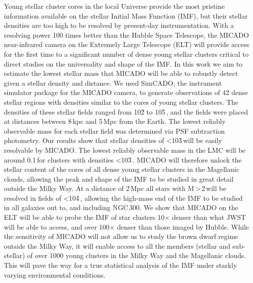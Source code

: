 % 

\abstract
{Young stellar cluster cores in the local Universe provide the most pristine information available on the stellar Initial Mass Function (IMF), but their stellar densities are too high to be resolved by present-day instrumentation. With a resolving power 100 times better than the Hubble Space Telescope, the MICADO near-infrared camera on the Extremely Large Telescope (ELT) will provide access for the first time to a significant number of dense young stellar clusters critical to direct studies on the universality and shape of the IMF.}
{In this work we aim to estimate the lowest stellar mass that MICADO will be able to robustly detect given a stellar density and distance.}
{We used SimCADO, the instrument simulator package for the MICADO camera, to generate observations of 42 dense stellar regions with densities similar to the cores of young stellar clusters. The densities of these stellar fields ranged from 10\h2 to 10\h5\,\spa, and the fields were placed at distances between 8\,kpc and 5\,Mpc from the Earth. The lowest reliably observable mass for each stellar field was determined via PSF subtraction photometry.}
{Our results show that stellar densities of \textless10\h3\,\spa will be easily resolvable by MICADO. The lowest reliably observable mass in the LMC will be around 0.1\,\msun for clusters with densities \textless10\h3\,\spa. MICADO will therefore unlock the stellar content of the cores of all dense young stellar clusters in the Magellanic clouds, allowing the peak and shape of the IMF to be studied in great detail outside the Milky Way. At a distance of 2\,Mpc all stars with M\,\textgreater\,2\,\msun will be resolved in fields of \textless10\h4\,\spa, allowing the high-mass end of the IMF to be studied in all galaxies out to, and including NGC\,300.}
{We show that MICADO on the ELT will be able to probe the IMF of star clusters 10$\times$ denser than what JWST will be able to access, and over 100$\times$ denser than those imaged by Hubble. While the sensitivity of MICADO will not allow us to study the brown dwarf regime outside the Milky Way, it will enable access to all the members (stellar and sub-stellar) of over 1000 young clusters in the Milky Way and the Magellanic clouds. This will pave the way for a true statistical analysis of the IMF under starkly varying environmental conditions.}



